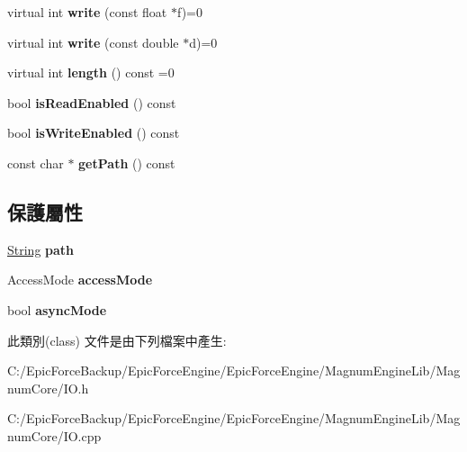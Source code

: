 \begin{DoxyCompactItemize}
\item 
virtual int {\bfseries write} (const float $\ast$f)=0\hypertarget{class_magnum_1_1_i_o_af181b157ad026ac385685ae4fd5eb8b2}{}\label{class_magnum_1_1_i_o_af181b157ad026ac385685ae4fd5eb8b2}

\item 
virtual int {\bfseries write} (const double $\ast$d)=0\hypertarget{class_magnum_1_1_i_o_a8a4a374b9aa321049cc50e7ab1f8b1c4}{}\label{class_magnum_1_1_i_o_a8a4a374b9aa321049cc50e7ab1f8b1c4}

\item 
virtual int {\bfseries length} () const  =0\hypertarget{class_magnum_1_1_i_o_a1968bc6c10bb3c2d984f638f64c48721}{}\label{class_magnum_1_1_i_o_a1968bc6c10bb3c2d984f638f64c48721}

\item 
bool {\bfseries is\+Read\+Enabled} () const \hypertarget{class_magnum_1_1_i_o_a9c3f4f8d7228777a1020307e254460d2}{}\label{class_magnum_1_1_i_o_a9c3f4f8d7228777a1020307e254460d2}

\item 
bool {\bfseries is\+Write\+Enabled} () const \hypertarget{class_magnum_1_1_i_o_ac3a9bd02f8d9e62d9524e2d887357d7f}{}\label{class_magnum_1_1_i_o_ac3a9bd02f8d9e62d9524e2d887357d7f}

\item 
const char $\ast$ {\bfseries get\+Path} () const \hypertarget{class_magnum_1_1_i_o_a9500060996c4b8077acd05bd40a926dc}{}\label{class_magnum_1_1_i_o_a9500060996c4b8077acd05bd40a926dc}

\end{DoxyCompactItemize}
\subsection*{保護屬性}
\begin{DoxyCompactItemize}
\item 
\hyperlink{class_magnum_1_1_string}{String} {\bfseries path}\hypertarget{class_magnum_1_1_i_o_a3520506712a671aae3e00b5038cfc789}{}\label{class_magnum_1_1_i_o_a3520506712a671aae3e00b5038cfc789}

\item 
Access\+Mode {\bfseries access\+Mode}\hypertarget{class_magnum_1_1_i_o_a85f2b61773cc49f36ad45e33e0ac75bd}{}\label{class_magnum_1_1_i_o_a85f2b61773cc49f36ad45e33e0ac75bd}

\item 
bool {\bfseries async\+Mode}\hypertarget{class_magnum_1_1_i_o_a28f8ad6c4dd3058b5cdd7f257f9c094b}{}\label{class_magnum_1_1_i_o_a28f8ad6c4dd3058b5cdd7f257f9c094b}

\end{DoxyCompactItemize}


此類別(class) 文件是由下列檔案中產生\+:\begin{DoxyCompactItemize}
\item 
C\+:/\+Epic\+Force\+Backup/\+Epic\+Force\+Engine/\+Epic\+Force\+Engine/\+Magnum\+Engine\+Lib/\+Magnum\+Core/I\+O.\+h\item 
C\+:/\+Epic\+Force\+Backup/\+Epic\+Force\+Engine/\+Epic\+Force\+Engine/\+Magnum\+Engine\+Lib/\+Magnum\+Core/I\+O.\+cpp\end{DoxyCompactItemize}

